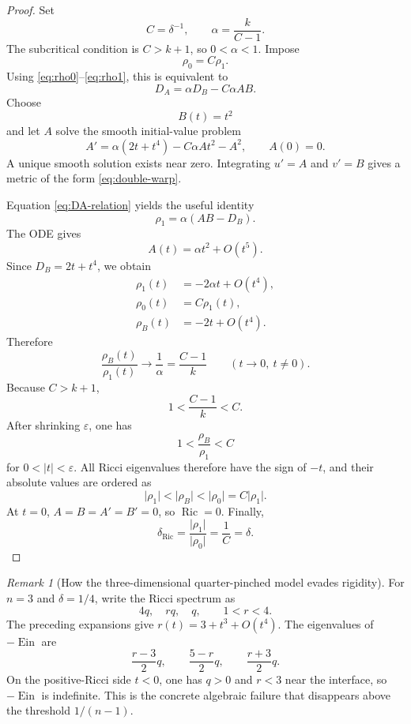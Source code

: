 \documentclass[11pt,reqno]{amsart}
\theoremstyle{definition}
\theoremstyle{remark}
\newtheorem{remark}[theorem]{Remark}
\newcommand{\Ric}{\operatorname{Ric}}
\newcommand{\Ein}{\operatorname{Ein}}
\newcommand{\dric}{\delta_{\mathrm{Ric}}}
\newcommand{\abs}[1]{\lvert #1\rvert}
\newcommand{\eps}{\varepsilon}
\begin{document}
\begin{proof}
Set
\[
C=\delta^{-1},
\qquad
\alpha=\frac{k}{C-1}.
\]
The subcritical condition is $C>k+1$, so $0<\alpha<1$.  Impose
\begin{equation}\label{eq:rho-relation-sub}
\rho_0=C\rho_1.
\end{equation}
Using \eqref{eq:rho0}--\eqref{eq:rho1}, this is equivalent to
\begin{equation}\label{eq:DA-relation}
D_A=\alpha D_B-C\alpha AB.
\end{equation}
Choose
\[
B(t)=t^2
\]
and let $A$ solve the smooth initial-value problem
\begin{equation}\label{eq:A-sub-ode}
A'=\alpha(2t+t^4)-C\alpha At^2-A^2,
\qquad A(0)=0.
\end{equation}
A unique smooth solution exists near zero.  Integrating $u'=A$ and $v'=B$ gives a metric of the form \eqref{eq:double-warp}.

Equation \eqref{eq:DA-relation} yields the useful identity
\begin{equation}\label{eq:rho1-useful}
\rho_1=\alpha(AB-D_B).
\end{equation}
The ODE gives
\[
A(t)=\alpha t^2+O(t^5).
\]
Since $D_B=2t+t^4$, we obtain
\begin{align*}
\rho_1(t)&=-2\alpha t+O(t^4),\\
\rho_0(t)&=C\rho_1(t),\\
\rho_B(t)&=-2t+O(t^4).
\end{align*}
Therefore
\begin{equation}\label{eq:ratio-sub}
\frac{\rho_B(t)}{\rho_1(t)}\longrightarrow
\frac1\alpha=\frac{C-1}{k}
\qquad(t\to0,\ t\ne0).
\end{equation}
Because $C>k+1$,
\[
1<\frac{C-1}{k}<C.
\]
After shrinking $\eps$, one has
\[
1<\frac{\rho_B}{\rho_1}<C
\]
for $0<\abs t<\eps$.  All Ricci eigenvalues therefore have the sign of $-t$, and their absolute values are ordered as
\[
\abs{\rho_1}<\abs{\rho_B}<\abs{\rho_0}=C\abs{\rho_1}.
\]
At $t=0$, $A=B=A'=B'=0$, so $\Ric=0$.  Finally,
\[
\dric=\frac{\abs{\rho_1}}{\abs{\rho_0}}=\frac1C=\delta.
\]
\end{proof}

\begin{remark}[How the three-dimensional quarter-pinched model evades rigidity]\label{rem:three-dim-Ein}
For $n=3$ and $\delta=1/4$, write the Ricci spectrum as
\[
4q,\quad rq,\quad q,
\qquad 1<r<4.
\]
The preceding expansions give $r(t)=3+t^3+O(t^4)$.  The eigenvalues of $-\Ein$ are
\[
\frac{r-3}{2}q,
\qquad
\frac{5-r}{2}q,
\qquad
\frac{r+3}{2}q.
\]
On the positive-Ricci side $t<0$, one has $q>0$ and $r<3$ near the interface, so $-\Ein$ is indefinite.  This is the concrete algebraic failure that disappears above the threshold $1/(n-1)$.
\end{remark}
\end{document}
